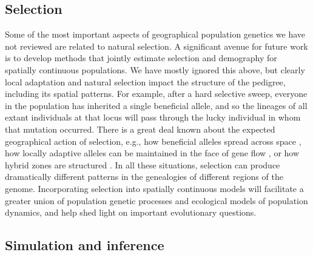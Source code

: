 \documentclass{ar-1col}
\begin{document}
\subsection{Selection}

Some of the most important aspects of geographical population genetics
we have not reviewed are related to natural selection.
A significant avenue for future work is to 
develop methods that jointly estimate selection and demography for spatially continuous populations. 
We have mostly ignored this above,
but clearly local adaptation and natural selection impact 
the structure of the pedigree, including its spatial patterns.
For example, after a hard selective sweep,
everyone in the population has inherited a single beneficial allele,
and so the lineages of all extant individuals at that locus will pass through the lucky individual
in whom that mutation occurred.
There is a great deal known about the expected geographical action of selection,
e.g., how beneficial alleles spread across space \citep{fisher1937wave,RalphCoop2010parallel,HallatschekFisher2014},
how locally adaptive alleles can be maintained in the face of gene flow \citep{slatkin1973geneflow,kruuk1999comparison,RalphCoop2015patchy},
or how hybrid zones are structured \citep{barton1985analysis,sedghifar_2015}.
In all these situations, selection can produce dramatically different patterns in the genealogies
of different regions of the genome.
Incorporating selection into spatially continuous models 
will facilitate a greater union of population genetic processes 
and ecological models of population dynamics, 
and help shed light on important evolutionary questions.


\subsection{Simulation and inference} 
\end{document}
